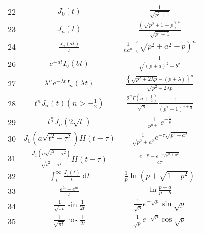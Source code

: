 \begin{table}
\begin{tabular}{|c|c|c|}
    22 & $J_0(t)$ & $\frac{1}{\sqrt{p^2+1}}$ \\
    23 & $J_n(t)$ & $\frac{\left(\sqrt{p^2+1}-p\right)^n}{\sqrt{p^2+1}}$ \\
    24 & $\frac{J_n(a t)}{t}$ & $\frac{1}{n a^n}\left(\sqrt{p^2+a^2}-p\right)^n$ \\
    26 & $e^{-a t} I_0(b t)$ & $\frac{1}{\sqrt{(p+a)^2-b^2}}$ \\
    27 & $\lambda^n e^{-\lambda t} I_n(\lambda t)$ & $\frac{\left\{\sqrt{p^2+2 \lambda p}-(p+\lambda)\right\}^n}{\sqrt{p^2+2 \lambda p}}$ \\
    28 & $t^n J_n(t)\left(n>-\frac{1}{2}\right)$ & $\frac{2^n \Gamma\left(n+\frac{1}{2}\right)}{\sqrt{\pi}} \frac{1}{\left(p^2+1\right)^{n+\frac{1}{2}}}$ \\
    29 & $t^{\frac{n}{2}} J_n(2 \sqrt{t})$ & $\frac{1}{p^{n+1}} e^{-\frac{1}{p}}$ \\
    30 & $J_0\left(a \sqrt{t^2-\tau^2}\right) H(t-\tau)$ & $\frac{1}{\sqrt{p^2+a^2}} e^{-\tau \sqrt{p^2+a^2}}$ \\
    31 & $\frac{J_1\left(a \sqrt{t^2-\tau^2}\right)}{\sqrt{t^2-\tau^2}} H(t-\tau)$ & $\frac{e^{-\tau p}-e^{-\tau \sqrt{p^2+a^2}}}{a \tau}$ \\
    32 & $\int_t^{\infty} \frac{J_0(t)}{t} \mathrm{~d} t$ & $\frac{1}{p} \ln \left(p+\sqrt{1+p^2}\right)$ \\
    33 & $\frac{e^{b t}-e^{a t}}{t}$ & $\ln \frac{p-a}{p-b}$ \\
    34 & $\frac{1}{\sqrt{\pi t}} \sin \frac{1}{2 t}$ & $\frac{1}{\sqrt{p}} e^{-\sqrt{p}} \sin \sqrt{p}$ \\
    35 & $\frac{1}{\sqrt{\pi t}} \cos \frac{1}{2 t}$ & $\frac{1}{\sqrt{p}} e^{-\sqrt{p}} \cos \sqrt{p}$ \\
    \hline
\end{tabular}
\end{table}
